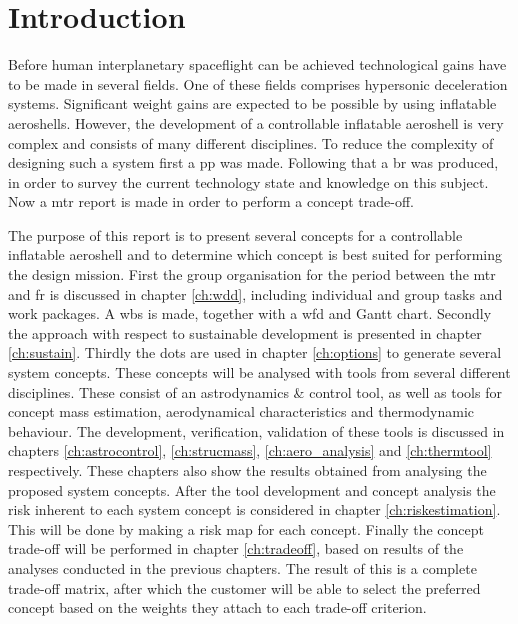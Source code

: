 \section{Introduction}
\label{cha:introduction}
Before human interplanetary spaceflight can be achieved technological gains have to be made in several fields. One of these fields comprises hypersonic deceleration systems. Significant weight gains are expected to be possible by using inflatable aeroshells. However, the development of a controllable inflatable aeroshell is very complex and consists of many different disciplines. To reduce the complexity of designing such a system first a \acrfull{pp} was made. Following that a \acrfull{br} was produced, in order to survey the current technology state and knowledge on this subject. Now a \acrfull{mtr} report is made in order to perform a concept trade-off. 

The purpose of this report is to present several concepts for a controllable inflatable aeroshell and to determine which concept is best suited for performing the design mission. First the group organisation for the period between the \acrlong{mtr} and \acrlong{fr} is discussed in chapter \ref{ch:wdd}, including individual and group tasks and work packages. A \acrfull{wbs} is made, together with a \acrfull{wfd} and Gantt chart. Secondly the approach with respect to sustainable development is presented in chapter \ref{ch:sustain}. Thirdly the \glspl{dot} are used in chapter \ref{ch:options} to generate several system concepts. These concepts will be analysed with tools from several different disciplines. These consist of an astrodynamics \& control tool, as well as tools for concept mass estimation, aerodynamical characteristics and thermodynamic behaviour. The development, verification, validation of these tools is discussed in chapters \ref{ch:astrocontrol}, \ref{ch:strucmass}, \ref{ch:aero_analysis} and \ref{ch:thermtool} respectively. These chapters also show the results obtained from analysing the proposed system concepts. After the tool development and concept analysis the risk inherent to each system concept is considered in chapter \ref{ch:riskestimation}. This will be done by making a risk map for each concept. Finally the concept trade-off will be performed in chapter \ref{ch:tradeoff}, based on results of the analyses conducted in the previous chapters. The result of this is a complete trade-off matrix, after which the customer will be able to select the preferred concept based on the weights they attach to each trade-off criterion.